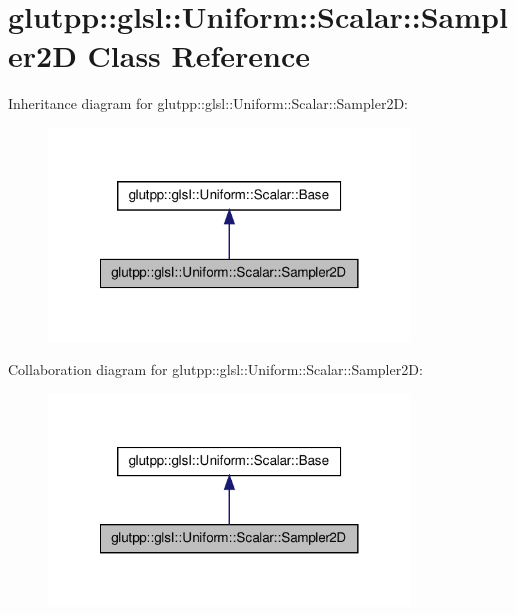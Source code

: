 \hypertarget{classglutpp_1_1glsl_1_1Uniform_1_1Scalar_1_1Sampler2D}{\section{glutpp\-:\-:glsl\-:\-:\-Uniform\-:\-:\-Scalar\-:\-:\-Sampler2\-D \-Class \-Reference}
\label{classglutpp_1_1glsl_1_1Uniform_1_1Scalar_1_1Sampler2D}
}


\-Inheritance diagram for glutpp\-:\-:glsl\-:\-:\-Uniform\-:\-:\-Scalar\-:\-:\-Sampler2\-D\-:
\nopagebreak
\begin{figure}[H]
\begin{center}
\leavevmode
\includegraphics[width=272pt]{classglutpp_1_1glsl_1_1Uniform_1_1Scalar_1_1Sampler2D__inherit__graph}
\end{center}
\end{figure}


\-Collaboration diagram for glutpp\-:\-:glsl\-:\-:\-Uniform\-:\-:\-Scalar\-:\-:\-Sampler2\-D\-:
\nopagebreak
\begin{figure}[H]
\begin{center}
\leavevmode
\includegraphics[width=272pt]{classglutpp_1_1glsl_1_1Uniform_1_1Scalar_1_1Sampler2D__coll__graph}
\end{center}
\end{figure}
